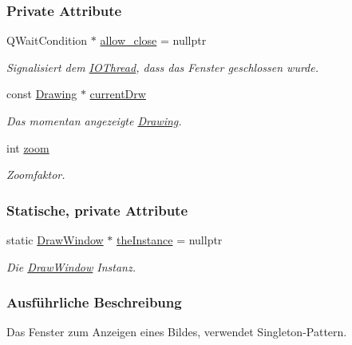 \subsubsection*{Private Attribute}
\begin{DoxyCompactItemize}
\item 
Q\+Wait\+Condition $\ast$ \mbox{\hyperlink{classDrawWindow_aa6f3d1f744277acdbfc121421b0760d7}{allow\+\_\+close}} = nullptr
\begin{DoxyCompactList}\small\item\em Signalisiert dem \mbox{\hyperlink{classIOThread}{I\+O\+Thread}}, dass das Fenster geschlossen wurde. \end{DoxyCompactList}\item 
const \mbox{\hyperlink{classDrawing}{Drawing}} $\ast$ \mbox{\hyperlink{classDrawWindow_ac63c11339aa1f1b0259699ca68bead6c}{current\+Drw}}
\begin{DoxyCompactList}\small\item\em Das momentan angezeigte \mbox{\hyperlink{classDrawing}{Drawing}}. \end{DoxyCompactList}\item 
int \mbox{\hyperlink{classDrawWindow_a69fa4fea9a23c970cba023ba863340fe}{zoom}}
\begin{DoxyCompactList}\small\item\em Zoomfaktor. \end{DoxyCompactList}\end{DoxyCompactItemize}
\subsubsection*{Statische, private Attribute}
\begin{DoxyCompactItemize}
\item 
static \mbox{\hyperlink{classDrawWindow}{Draw\+Window}} $\ast$ \mbox{\hyperlink{classDrawWindow_a39187946e41c9e9087484cba77e7fd5b}{the\+Instance}} = nullptr
\begin{DoxyCompactList}\small\item\em Die \mbox{\hyperlink{classDrawWindow}{Draw\+Window}} Instanz. \end{DoxyCompactList}\end{DoxyCompactItemize}


\subsubsection{Ausführliche Beschreibung}
Das Fenster zum Anzeigen eines Bildes, verwendet Singleton-\/\+Pattern. 

